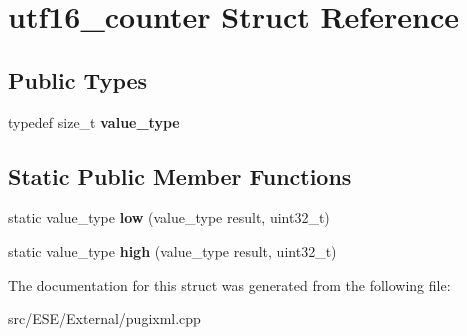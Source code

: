 \hypertarget{structutf16__counter}{\section{utf16\-\_\-counter Struct Reference}
\label{structutf16__counter}
}
\subsection*{Public Types}
\begin{DoxyCompactItemize}
\item 
\hypertarget{structutf16__counter_a0d63f9ca809d182b2f184ef93bd11107}{typedef size\-\_\-t {\bfseries value\-\_\-type}}\label{structutf16__counter_a0d63f9ca809d182b2f184ef93bd11107}

\end{DoxyCompactItemize}
\subsection*{Static Public Member Functions}
\begin{DoxyCompactItemize}
\item 
\hypertarget{structutf16__counter_a4571f3d0fbf0ce763904ec3321dcb41e}{static value\-\_\-type {\bfseries low} (value\-\_\-type result, uint32\-\_\-t)}\label{structutf16__counter_a4571f3d0fbf0ce763904ec3321dcb41e}

\item 
\hypertarget{structutf16__counter_ac1a8793996e57dc28fd22f3165628e4d}{static value\-\_\-type {\bfseries high} (value\-\_\-type result, uint32\-\_\-t)}\label{structutf16__counter_ac1a8793996e57dc28fd22f3165628e4d}

\end{DoxyCompactItemize}


The documentation for this struct was generated from the following file\-:\begin{DoxyCompactItemize}
\item 
src/\-E\-S\-E/\-External/pugixml.\-cpp\end{DoxyCompactItemize}
